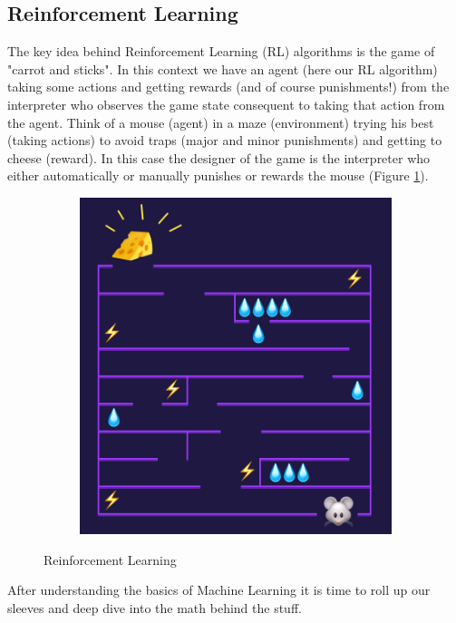 \documentclass[12pt]{article}
\begin{document}
\subsection{Reinforcement Learning}
The key idea behind Reinforcement Learning (RL) algorithms is the game of "carrot and sticks". In this context we have an agent (here our RL algorithm) taking some actions and getting rewards (and of course punishments!) from the interpreter who observes the game state consequent to taking that action from the agent. Think of a mouse (agent) in a maze (environment) trying his best (taking actions) to avoid traps (major and minor punishments) and getting to cheese (reward). In this case the designer of the game is the interpreter who either automatically or manually punishes or rewards the mouse (Figure \ref{fig:rl}).
\begin{figure}[h!]
  \centering  
  \begin{subfigure}[b]{0.7\linewidth}
    \includegraphics[width=\linewidth]{./images/rl.png}
  \end{subfigure}
  \caption{Reinforcement Learning}
  \label{fig:rl}
\end{figure}

After understanding the basics of Machine Learning it is time to roll up our sleeves and deep dive into the math behind the stuff.
\end{document}
